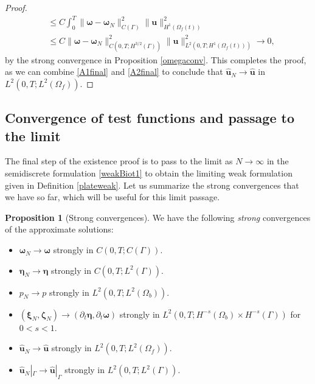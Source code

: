 \documentclass[11pt]{article}
\newcommand{\bd}{\boldsymbol}
\theoremstyle{definition}
\newtheorem{proposition}{Proposition}[section]
\begin{document}
\begin{proof}
\begin{align}
&\le C \int_{0}^{T} \|\bd{\omega} - \bd{\omega}_{N}\|_{C(\Gamma)}^{2} \|\bd{u}\|_{H^{1}(\Omega_{f}(t))}^{2} \nonumber \\
&\le C \|\bd{\omega} - \bd{\omega}_{N}\|_{C(0, T; H^{3/2}(\Gamma))}^{2} \|\bd{u}\|^{2}_{L^{2}(0, T; H^{1}(\Omega_{f}(t)))} \to 0,
\end{align}
by the strong convergence in Proposition \ref{omegaconv}. This completes the proof, as we can combine \eqref{A1final} and \eqref{A2final} to conclude that $\hat{\bd{u}}_{N} \to \hat{\bd{u}}$ in $L^{2}(0, T; L^{2}(\Omega_{f}))$. 
\end{proof}

\medskip

\subsection{Convergence of test functions and passage to the limit}\label{testfunctions}

The final step of the existence proof is to pass to the limit as $N \to \infty$ in the semidiscrete formulation \eqref{weakBiot1} to obtain the limiting weak formulation given in Definition \ref{plateweak}. Let us summarize the strong convergences that we have so far, which will be useful for this limit passage.

\begin{proposition}[Strong convergences]\label{strongsummary}
We have the following \textit{strong} convergences of the approximate solutions:
\begin{itemize}
\item $\bd{\omega}_{N} \to \bd{\omega}$ strongly in $C(0, T; C(\Gamma))$.
\item $\bd{\eta}_{N} \to \bd{\eta}$ strongly in $C(0, T; L^{2}(\Gamma))$.
\item $p_{N} \to p$ strongly in $L^{2}(0, T; L^{2}(\Omega_{b}))$.
\item $(\bd{\xi}_{N}, \bd{\zeta}_{N}) \to (\partial_{t}\bd{\eta}, \partial_{t}\bd{\omega})$ strongly in $L^{2}(0, T; H^{-s}(\Omega_{b}) \times H^{-s}(\Gamma))$ for $0 < s < 1$.
\item $\hat{\bd{u}}_{N} \to \hat{\bd{u}}$ strongly in $L^{2}(0, T; L^{2}(\Omega_{f}))$.
\item $\hat{\bd{u}}_{N}|_{\Gamma} \to \hat{\bd{u}}|_{\Gamma}$ strongly in $L^{2}(0, T; L^{2}(\Gamma))$. 
\end{itemize}
\end{proposition}
\end{document}
